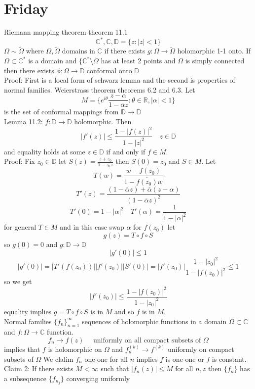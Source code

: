 \documentclass[11pt]{article}
\begin{document}
\section{Friday}
Riemann mapping theorem theorem 11.1
\[
    \mathbb{C}^{*}, \mathbb{C}, \mathbb{D} = \{z : |z| < 1\}
\] 
$\Omega \sim \tilde \Omega$ where  $\Omega, \tilde \Omega$ domains in  $ \mathbb{C}$
if there exists $g : \Omega \to \tilde \Omega$ holomorphic 1-1 onto.
If  $\Omega \subset \mathbb{C}^{*}$ is a domain and  $\{ \mathbb{C}^{*} \setminus \Omega$ has at least 2 points
and $\Omega$ is simply connected then there exists $\phi : \Omega \to \mathbb{D}$ conformal onto $ \mathbb{D}$\\
Proof: 
First is a local form of schwarz lemma and the second is properties of normal families. Weierstrass theorem theorems 6.2 and 6.3.
Let
\[
    M = \{ e^{i \theta} \frac{z-\alpha}{1- \overline{\alpha}z} : \theta \in \mathbb{R}, |\alpha| < 1\}
\] 
is the set of conformal mappings from $ \mathbb{D} \to \mathbb{D}$\\
Lemma 11.2:  $f : \mathbb{D} \to \mathbb{D}$ holomorphic. Then
 \[
     |f'(z)|  \le \frac{1- |f(z)|^2}{1 - |z|^2} \quad z \in \mathbb{D}
\] 
and equality holds at some $z \in \mathbb{D}$ if and only if  $f \in M$.\\
Proof: Fix  $z_0 \in \mathbb{D}$ let $S(z) = \frac{z + z_0}{1- \overline{z_0}z}$ then $S(0) = z_0$ and $S \in M$.
Let
 \[
     T(w) = \frac{w - f(z_0)}{1 - \overline{f(z_{0})}w}
\] 
\[
T'(z) = \frac{(1- \overline{\alpha}z) + \overline{\alpha}(z-\alpha)}{(1- \overline{\alpha}z)^2}
\] 
\[
T'(0) = 1 - |\alpha|^2 \quad T'(\alpha)  = \frac{1}{1- |\alpha|^2}
\] 
for general $T \in M$ and in this case swap  $\alpha$ for $f(z_{0})$
let
\[
g(z) = T \circ f \circ S
\] 
so $g(0) = 0$ and  $g : \mathbb{D} \to \mathbb{D}$
 \[
|g'(0)| \le 1
\] 
\[
|g'(0)| = |T'(f(z_0))||f'(z_0)||S'(0)| = |f'(z_0)| \frac{1- |z_0|^2}{1 - |f(z_0)|^2} \le 1
\] 
so we get
\[
|f'(z_0)| \le \frac{1- |f(z_0)|^2}{1 - |z_0|^2}
\] 
equality implies $g = T \circ f \circ S$ is in  $M$ and so  $f$ is in $M$.\\
Normal families
$\{f_n\}_{n=1}^{\infty}$ sequences of holomorphic functions in a domain $\Omega \subset \mathbb{C}$ and $f : \Omega \to \mathbb{C}$ function.
\[
    f_n \to f(z) \quad \text{ uniformly on all compact subsets of $\Omega$}
\] 
implies that $f$ is holomorphic on $\Omega$ and  $f_n^{(k)} \to f^{(k)}$ uniformly on compact subsets of $\Omega$
We clalim  $f_n$ one-one for all  $n $ implies  $f$ is one-one or  $f$ is constant.
Claim 2: If there exists $M < \infty$ such that $|f_n(z)|  \le M$ for all  $n,z$ then  $\{f_n\}$ has a subsequence  $\{f_{n_j}\}$ converging uniformly
\end{document}
